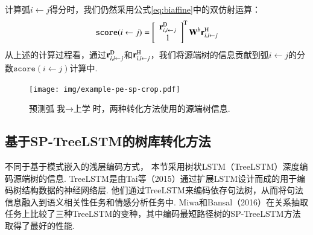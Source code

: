 计算弧$i \leftarrow j$得分时，我们仍然采用公式\ref{eq:biaffine}中的双仿射运算：
\begin{equation} \label{eq:biaffine_pat}
    \texttt{score}(i \leftarrow j) =  \left[
        \begin{array}{c}
            \mathbf{r}_{i,i \leftarrow j}^{\textup{D}} \\
            1
        \end{array}
        \right]^\mathrm{T}
    \mathbf{W}^b  \mathbf{r}_{i,i \leftarrow j}^{\textup{H}}
\end{equation}
从上述的计算过程看，通过$\mathbf{r}_{i,i \leftarrow j}^{\textup{D}}$和$\mathbf{r}_{i,i \leftarrow j}^{\textup{H}}$，我们将源端树的信息贡献到弧$i \leftarrow j$的分数$\texttt{score}(i \leftarrow j)$计算中.

\begin{figure}[hb]
    \centering
    \texttt{[image: img/example-pe-sp-crop.pdf]}
    \caption{预测弧$\mbox{我}\rightarrow \mbox{上学}$时，两种转化方法使用的源端树信息. }
    \label{fig:example_pe_sp}
\end{figure}

\subsection{基于SP-TreeLSTM的树库转化方法}
不同于基于模式嵌入的浅层编码方式，
本节采用树状LSTM（TreeLSTM）深度编码源端树的信息.
TreeLSTM是由Tai等（2015）通过扩展LSTM设计而成的用于编码树结构数据的神经网络层.
他们通过TreeLSTM来编码依存句法树，从而将句法信息融入到语义相关性任务和情感分析任务中.
Miwa和Bansal（2016）在关系抽取任务上比较了三种TreeLSTM的变种，其中编码最短路径树的SP-TreeLSTM方法取得了最好的性能.

